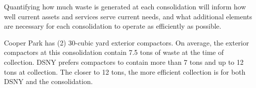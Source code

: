 
    Quantifying how much waste is generated at each consolidation will inform how well current assets and services serve current needs, and what additional elements are necessary for each consolidation to operate as efficiently as possible.
    
    Cooper Park has (2) 30-cubic yard exterior compactors. On average, the exterior compactors at this consolidation contain 7.5 tons of waste at the time of collection. DSNY prefers compactors to contain more than 7 tons and up to 12 tons at collection. The closer to 12 tons, the more efficient collection is for both DSNY and the consolidation.